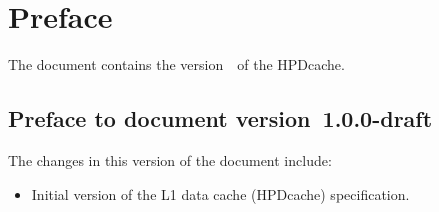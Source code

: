 \chapter*{Preface}

The document contains the version~\docversion~of the HPDcache.

\section*{Preface to document version~1.0.0-draft}

The changes in this version of the document include:
\begin{itemize}
\parskip 0pt
\itemsep 1pt
\item Initial version of the L1 data cache (HPDcache) specification.
\end{itemize}

